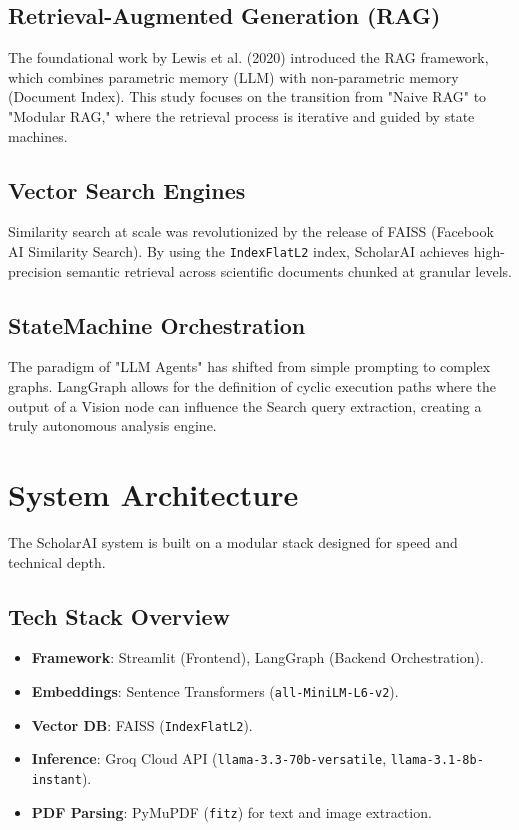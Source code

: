 \documentclass[11pt,a4paper,oneside]{report}
\begin{document}
\section{Retrieval-Augmented Generation (RAG)}
The foundational work by Lewis et al. (2020) \cite{lewis2020rag} introduced the RAG framework, which combines parametric memory (LLM) with non-parametric memory (Document Index). This study focuses on the transition from "Naive RAG" to "Modular RAG," where the retrieval process is iterative and guided by state machines.

\section{Vector Search Engines}
Similarity search at scale was revolutionized by the release of FAISS (Facebook AI Similarity Search). By using the \texttt{IndexFlatL2} index, ScholarAI achieves high-precision semantic retrieval across scientific documents chunked at granular levels.

\section{StateMachine Orchestration}
The paradigm of "LLM Agents" has shifted from simple prompting to complex graphs. LangGraph allows for the definition of cyclic execution paths where the output of a Vision node can influence the Search query extraction, creating a truly autonomous analysis engine.

\chapter{System Architecture}
\label{ch:architecture}

The ScholarAI system is built on a modular stack designed for speed and technical depth.

\section{Tech Stack Overview}
\begin{itemize}
    \item \textbf{Framework}: Streamlit (Frontend), LangGraph (Backend Orchestration).
    \item \textbf{Embeddings}: Sentence Transformers (\texttt{all-MiniLM-L6-v2}).
    \item \textbf{Vector DB}: FAISS (\texttt{IndexFlatL2}).
    \item \textbf{Inference}: Groq Cloud API (\texttt{llama-3.3-70b-versatile}, \texttt{llama-3.1-8b-instant}).
    \item \textbf{PDF Parsing}: PyMuPDF (\texttt{fitz}) for text and image extraction.
\end{itemize}
\end{document}
